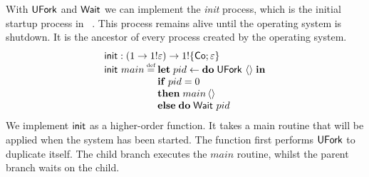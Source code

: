\documentclass[12pt,phd,lfcs,twoside,openright,logo,leftchapter,normalheadings]{infthesis}
\theoremstyle{plain}
\theoremstyle{definition}
\begin{document}
With $\mathsf{UFork}$ and $\mathsf{Wait}$ we can implement the \emph{init} process,
which is the initial startup process in
\UNIX{}~\cite{RitchieT74}. This process remains alive until the
operating system is shutdown. It is the ancestor of every process
created by the operating system.
%
\[
  \bl
    \init : (\UnitType \to \UnitType \eff \varepsilon) \to \UnitType \eff \{\Co;\varepsilon\}\\
    \init~main \defas
      \bl
        \Let\;pid \revto \Do\;\UFork~\Unit\;\In\\
        \If\;pid = 0\\
        \Then\;main\,\Unit\\
        \Else\;\Do\;\Wait~pid
      \el
  \el
\]
%
We implement $\mathsf{init}$ as a higher-order function. It takes a main
routine that will be applied when the system has been started. The
function first performs $\mathsf{UFork}$ to duplicate itself. The child branch
executes the $main$ routine, whilst the parent branch waits on the
child.
\end{document}
